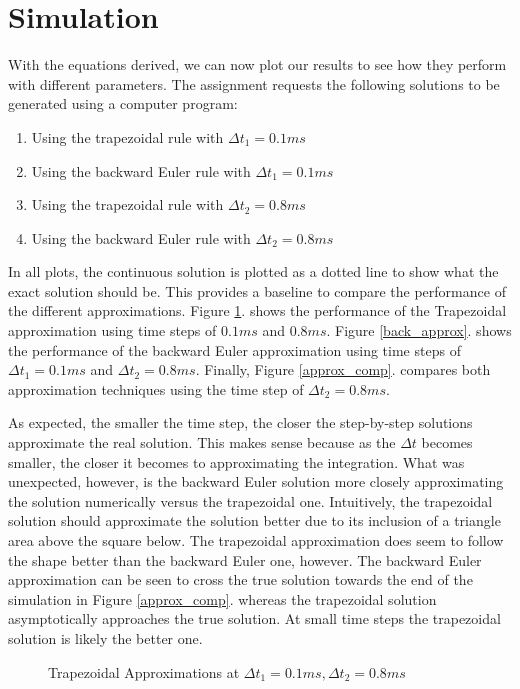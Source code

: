 \documentclass[10pt, oneside, letterpaper]{article}
\begin{document}
\section{Simulation}
With the equations derived, we can now plot our results to see how they perform with different parameters. The assignment requests the following solutions to be generated using a computer program:
\begin{enumerate}[label=\alph*)]
  \item Using the trapezoidal rule with $\Delta{}t_1 = 0.1ms$
  \item Using the backward Euler rule with $\Delta{}t_1 = 0.1ms$
  \item Using the trapezoidal rule with $\Delta{}t_2 = 0.8ms$
  \item Using the backward Euler rule with $\Delta{}t_2 = 0.8ms$
\end{enumerate}
In all plots, the continuous solution is plotted as a dotted line to show what the exact solution should be. This provides a baseline to compare the performance of the different approximations. Figure \ref{trap_approx}. shows the performance of the Trapezoidal approximation using time steps of $0.1ms$ and $0.8ms$. Figure \ref{back_approx}. shows the performance of the backward Euler approximation using time steps of $\Delta{}t_1 = 0.1ms$ and $\Delta{}t_2 = 0.8ms$. Finally, Figure \ref{approx_comp}. compares both approximation techniques using the time step of $\Delta{}t_2 = 0.8ms$.

As expected, the smaller the time step, the closer the step-by-step solutions approximate the real solution. This makes sense because as the $\Delta{}t$ becomes smaller, the closer it becomes to approximating the integration. What was unexpected, however, is the backward Euler solution more closely approximating the solution numerically versus the trapezoidal one. Intuitively, the trapezoidal solution should approximate the solution better due to its inclusion of a triangle area above the square below. The trapezoidal approximation does seem to follow the shape better than the backward Euler one, however. The backward Euler approximation can be seen to cross the true solution towards the end of the simulation in Figure \ref{approx_comp}. whereas the trapezoidal solution asymptotically approaches the true solution. At small time steps the trapezoidal solution is likely the better one.
\begin{figure}[H]
    \begin{center}
        
    \end{center}
    \caption{Trapezoidal Approximations at $\Delta{}t_1 = 0.1 ms, \Delta{}t_2 = 0.8 ms$}
    \label{trap_approx}
\end{figure}
\end{document}

